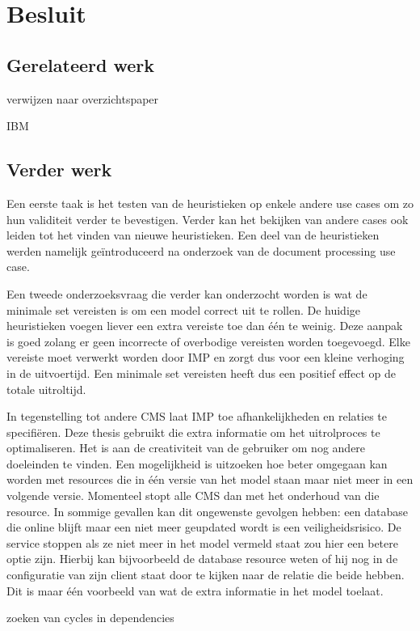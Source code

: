 \chapter{Besluit}
\label{sec:besluit}

\section{Gerelateerd werk}
verwijzen naar overzichtspaper

IBM

\section{Verder werk}
Een eerste taak is het testen van de heuristieken op enkele andere use cases om zo hun validiteit verder te bevestigen.
Verder kan het bekijken van andere cases ook leiden tot het vinden van nieuwe heuristieken.
Een deel van de heuristieken werden namelijk ge\"introduceerd na onderzoek van de document processing use case. 

Een tweede onderzoeksvraag die verder kan onderzocht worden is wat de minimale set vereisten is om een model correct uit te rollen.
De huidige heuristieken voegen liever een extra vereiste toe dan \'e\'en te weinig.
Deze aanpak is goed zolang er geen incorrecte of overbodige vereisten worden toegevoegd.
Elke vereiste moet verwerkt worden door IMP en zorgt dus voor een kleine verhoging in de uitvoertijd.
Een minimale set vereisten heeft dus een positief effect op de totale uitroltijd.

In tegenstelling tot andere CMS laat IMP toe afhankelijkheden en relaties te specifi\"eren.
Deze thesis gebruikt die extra informatie om het uitrolproces te optimaliseren.
Het is aan de creativiteit van de gebruiker om nog andere doeleinden te vinden.
Een mogelijkheid is uitzoeken hoe beter omgegaan kan worden met resources die in \'e\'en versie van het model staan maar niet meer in een volgende versie.
Momenteel stopt alle CMS dan met het onderhoud van die resource. 
In sommige gevallen kan dit ongewenste gevolgen hebben: een database die online blijft maar een niet meer geupdated wordt is een veiligheidsrisico.
De service stoppen als ze niet meer in het model vermeld staat zou hier een betere optie zijn.
Hierbij kan bijvoorbeeld de database resource weten of hij nog in de configuratie van zijn client staat door te kijken naar de relatie die beide hebben.
Dit is maar \'e\'en voorbeeld van wat de extra informatie in het model toelaat.

zoeken van cycles in dependencies
